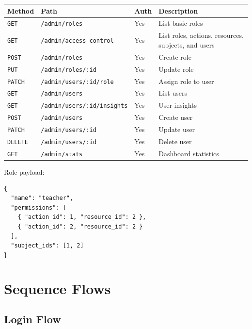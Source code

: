 \documentclass[11pt,a4paper]{article}
\newcommand{\docpath}[1]{\texttt{#1}}
\begin{document}
\begin{longtable}{L{0.12\textwidth}L{0.30\textwidth}L{0.12\textwidth}L{0.36\textwidth}}
\toprule
\textbf{Method} & \textbf{Path} & \textbf{Auth} & \textbf{Description} \\
\midrule
\endhead
\docpath{GET} & \docpath{/admin/roles} & Yes & List basic roles \\
\docpath{GET} & \docpath{/admin/access-control} & Yes & List roles, actions, resources, subjects, and users \\
\docpath{POST} & \docpath{/admin/roles} & Yes & Create role \\
\docpath{PUT} & \docpath{/admin/roles/:id} & Yes & Update role \\
\docpath{PATCH} & \docpath{/admin/users/:id/role} & Yes & Assign role to user \\
\docpath{GET} & \docpath{/admin/users} & Yes & List users \\
\docpath{GET} & \docpath{/admin/users/:id/insights} & Yes & User insights \\
\docpath{POST} & \docpath{/admin/users} & Yes & Create user \\
\docpath{PATCH} & \docpath{/admin/users/:id} & Yes & Update user \\
\docpath{DELETE} & \docpath{/admin/users/:id} & Yes & Delete user \\
\docpath{GET} & \docpath{/admin/stats} & Yes & Dashboard statistics \\
\bottomrule
\end{longtable}

Role payload:
\begin{lstlisting}[style=doccode]
{
  "name": "teacher",
  "permissions": [
    { "action_id": 1, "resource_id": 2 },
    { "action_id": 2, "resource_id": 2 }
  ],
  "subject_ids": [1, 2]
}
\end{lstlisting}

\section{Sequence Flows}

\subsection{Login Flow}
\end{document}
